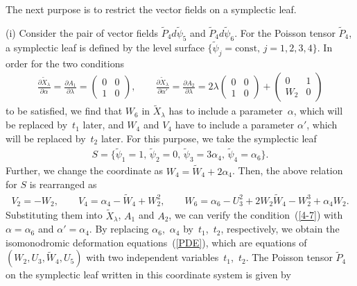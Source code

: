 \documentclass[10pt,a4paper]{amsart}
\numberwithin{equation}{section}
\begin{document}
The next purpose is to restrict the vector f\/ields on a symplectic leaf.

(i) Consider the pair of vector f\/ields $\widetilde{P}_4 d\widetilde{\psi}_5$ and $\widetilde{P}_4 d\widetilde{\psi}_6$. For the Poisson tensor $\widetilde{P}_4$, a symplectic leaf is def\/ined by the level surface $\{ \widetilde{\psi}_j = \text{const},\, j=1,2,3,4\}$. In order for the two conditions
\begin{gather}
\frac{\partial \widetilde{X}_\lambda }{\partial \alpha } = \frac{\partial A_1 }{\partial \lambda } = \left(
\begin{matrix}
0 & 0 \\
1 & 0
\end{matrix}
\right), \qquad
\frac{\partial \widetilde{X}_\lambda }{\partial \alpha' } = \frac{\partial A_2 }{\partial \lambda } = 2\lambda \left(
\begin{matrix}
0 & 0 \\
1 & 0
\end{matrix}
\right) + \left(
\begin{matrix}
0 & 1 \\
W_2 & 0
\end{matrix}
\right)\label{4-7}
\end{gather}
to be satisf\/ied, we f\/ind that $W_6$ in $\widetilde{X}_\lambda $ has to include a parameter~$\alpha $, which will be replaced by~$t_1$ later, and $W_4$ and $V_4$ have to include a parameter $\alpha' $, which will be replaced by~$t_2$ later. For this purpose, we take the symplectic leaf
\begin{gather*}
S = \big\{ \widetilde{\psi}_1 = 1,\, \widetilde{\psi}_2 = 0 ,\, \widetilde{\psi}_3 = 3\alpha _4,\,\widetilde{\psi}_4 = \alpha _6\big\}.
\end{gather*}
Further, we change the coordinate as $W_4 = \widetilde{W}_4 + 2\alpha _4$. Then, the above relation for $S$ is rearranged as
\begin{gather*}
 V_2 = -W_2,\qquad V_4 = \alpha _4-\widetilde{W}_4+W_2^2,\qquad W_6 = \alpha _6 - U_3^2 + 2W_2\widetilde{W}_4 - W_2^3 + \alpha _4W_2.
\end{gather*}
Substituting them into $\widetilde{X}_\lambda$, $A_1$ and $A_2$, we can verify the condition~(\ref{4-7}) with $\alpha = \alpha _6$ and $\alpha ' = \alpha _4$. By replacing $\alpha _6$,~$\alpha _4$ by~$t_1$,~$t_2$, respectively, we obtain the isomonodromic deformation equations~(\ref{PDE}), which are equations of $(W_2,U_3,\widetilde{W}_4, U_5)$ with two independent variables~$t_1$,~$t_2$. The Poisson tensor $\widetilde{P}_4$ on the symplectic leaf written in this coordinate system is given by
\end{document}

